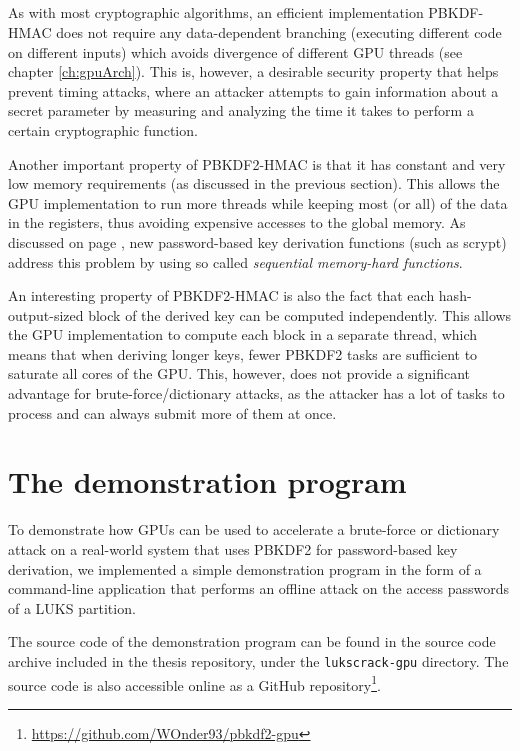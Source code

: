 \documentclass[12pt,oneside]{fithesis2}
\begin{document}
      \paragraph*{}
      As with most cryptographic algorithms, an efficient implementation PBKDF-HMAC does not require any data-dependent branching (executing different code on different inputs) which avoids divergence of different GPU threads (see chapter \ref{ch:gpuArch}). This is, however, a desirable security property that helps prevent timing attacks, where an attacker attempts to gain information about a secret parameter by measuring and analyzing the time it takes to perform a certain cryptographic function.
      
      Another important property of PBKDF2-HMAC is that it has constant and very low memory requirements (as discussed in the previous section). This allows the GPU implementation to run more threads while keeping most (or all) of the data in the registers, thus avoiding expensive accesses to the global memory. As discussed on page \pageref{p:memoryHard}, new password-based key derivation functions (such as scrypt) address this problem by using so called \emph{sequential memory-hard functions}.
      
      An interesting property of PBKDF2-HMAC is also the fact that each hash-output-sized block of the derived key can be computed independently. This allows the GPU implementation to compute each block in a separate thread, which means that when deriving longer keys, fewer PBKDF2 tasks are sufficient to saturate all cores of the GPU. This, however, does not provide a significant advantage for brute-force/dictionary attacks, as the attacker has a lot of tasks to process and can always submit more of them at once.
      
    \chapter{The demonstration program}
      To demonstrate how GPUs can be used to accelerate a brute-force or dictionary attack on a real-world system that uses PBKDF2 for password-based key derivation, we implemented a simple demonstration program in the form of a command-line application that performs an offline attack on the access passwords of a LUKS partition.
      
      The source code of the demonstration program can be found in the source code archive included in the thesis repository, under the \texttt{lukscrack-gpu} directory. The source code is also accessible online as a GitHub repository\footnote{\url{https://github.com/WOnder93/pbkdf2-gpu}}.
      
\end{document}
